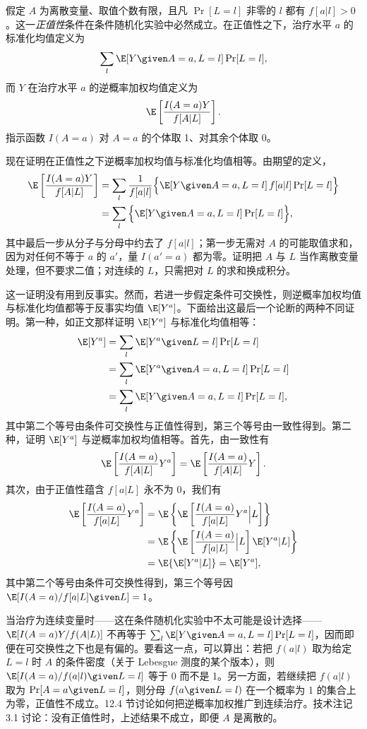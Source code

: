 \begin{techpoint}[逆概率加权与标准化的等价性]
假定 $A$ 为离散变量、取值个数有限，且凡 $\Pr[L=l]$ 非零的 $l$ 都有 $f[a|l]>0$。这一\emph{正值性}条件在条件随机化实验中必然成立。在正值性之下，治疗水平 $a$ 的标准化均值定义为
\[
\sum_l\E[Y\given A=a,L=l]\Pr[L=l],
\]
而 $Y$ 在治疗水平 $a$ 的逆概率加权均值定义为
\[
\E\left[\frac{I(A=a)Y}{f[A|L]}\right].
\]
指示函数 $I(A=a)$ 对 $A=a$ 的个体取 1、对其余个体取 0。

现在证明在正值性之下逆概率加权均值与标准化均值相等。由期望的定义，
\begin{align*}
\E\left[\frac{I(A=a)Y}{f[A|L]}\right]
&=\sum_l\frac{1}{f[a|l]}\Big\{\E[Y\given A=a,L=l]\,f[a|l]\Pr[L=l]\Big\}\\
&=\sum_l\Big\{\E[Y\given A=a,L=l]\Pr[L=l]\Big\},
\end{align*}
其中最后一步从分子与分母中约去了 $f[a|l]$；第一步无需对 $A$ 的可能取值求和，因为对任何不等于 $a$ 的 $a'$，量 $I(a'=a)$ 都为零。证明把 $A$ 与 $L$ 当作离散变量处理，但不要求二值；对连续的 $L$，只需把对 $L$ 的求和换成积分。

这一证明没有用到反事实。然而，若进一步假定条件可交换性，则逆概率加权均值与标准化均值都等于反事实均值 $\E[Y^{a}]$。下面给出这最后一个论断的两种不同证明。第一种，如正文那样证明 $\E[Y^{a}]$ 与标准化均值相等：
\begin{align*}
\E[Y^{a}]&=\sum_l\E[Y^{a}\given L=l]\Pr[L=l]\\
&=\sum_l\E[Y^{a}\given A=a,L=l]\Pr[L=l]\\
&=\sum_l\E[Y\given A=a,L=l]\Pr[L=l],
\end{align*}
其中第二个等号由条件可交换性与正值性得到，第三个等号由一致性得到。第二种，证明 $\E[Y^{a}]$ 与逆概率加权均值相等。首先，由一致性有
\[
\E\left[\frac{I(A=a)}{f[A|L]}Y^{a}\right]=\E\left[\frac{I(A=a)}{f[A|L]}Y\right].
\]
其次，由于正值性蕴含 $f[a|L]$ 永不为 0，我们有
\begin{align*}
\E\left[\frac{I(A=a)}{f[a|L]}Y^{a}\right]
&=\E\left\{\E\left[\frac{I(A=a)}{f[a|L]}Y^{a}\Big|L\right]\right\}\\
&=\E\left\{\E\left[\frac{I(A=a)}{f[a|L]}\Big|L\right]\E[Y^{a}|L]\right\}\\
&=\E\{\E[Y^{a}|L]\}=\E[Y^{a}],
\end{align*}
其中第二个等号由条件可交换性得到，第三个等号因 $\E[I(A=a)/f[a|L]\given L]=1$。

当治疗为连续变量时——这在条件随机化实验中不太可能是设计选择——$\E[I(A=a)Y/f(A|L)]$ 不再等于 $\sum_l\E[Y\given A=a,L=l]\Pr[L=l]$，因而即便在可交换性之下也是有偏的。要看这一点，可以算出：若把 $f(a|l)$ 取为给定 $L=l$ 时 $A$ 的条件密度（关于 Lebesgue 测度的某个版本），则 $\E[I(A=a)/f(a|l)\given L=l]$ 等于 0 而不是 1。另一方面，若继续把 $f(a|l)$ 取为 $\Pr[A=a\given L=l]$，则分母 $f(a\given L=l)$ 在一个概率为 1 的集合上为零，正值性不成立。12.4 节讨论如何把逆概率加权推广到连续治疗。技术注记 3.1 讨论：没有正值性时，上述结果不成立，即便 $A$ 是离散的。
\end{techpoint}

